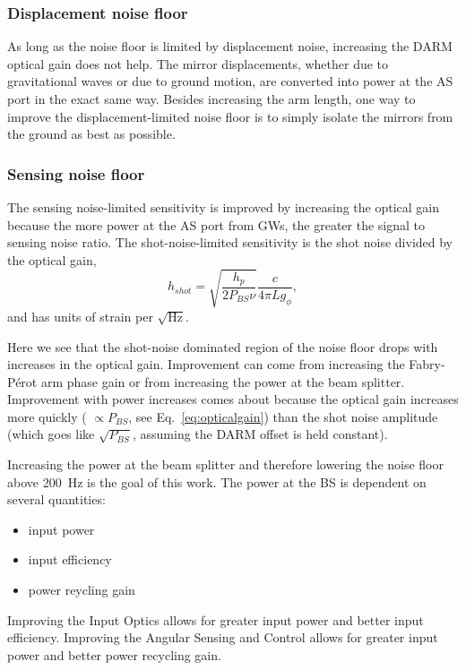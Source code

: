 \subsubsection{Displacement noise floor} 
As long as the noise floor is limited by displacement noise,
increasing the DARM optical gain does not help. The mirror
displacements, whether due to gravitational waves or due to ground
motion, are converted into power at the AS port in the exact same
way. Besides increasing the arm length, one way to improve the
displacement-limited noise floor is to simply isolate the mirrors from
the ground as best as possible.

\subsubsection{Sensing noise floor}
The sensing noise-limited sensitivity is improved by increasing the
optical gain because the more power at the AS port from GWs, the
greater the signal to sensing noise ratio. The shot-noise-limited
sensitivity is the shot noise divided by the optical gain,
\begin{equation}
h_{shot} = \sqrt{\frac{h_p}{2 P_{BS} \nu}} \frac{c}{4 \pi L g_{\phi}},
\label{eq:SNL}
\end{equation}
and has units of strain per $\sqrt{\mathrm{Hz}}$.

Here we see that the shot-noise dominated region of the noise floor
drops with increases in the optical gain. Improvement can come from
increasing the Fabry-P\'{e}rot arm phase gain or from increasing the
power at the beam splitter.  Improvement with power increases comes
about because the optical gain increases more quickly ( $\propto
P_{BS}$, see Eq.~\ref{eq:opticalgain}) than the shot noise amplitude
(which goes like $\sqrt{P_{BS}}$, assuming the DARM offset is held
constant).

Increasing the power at the beam splitter and therefore lowering the
noise floor above 200~Hz is the goal of this work. The power at the BS
is dependent on several quantities:
\begin{itemize}
\item input power \vspace{-10 pt}
\item input efficiency \vspace{-10 pt}
\item power reycling gain
\end{itemize}
Improving the Input Optics allows for greater input power and better
input efficiency. Improving the Angular Sensing and Control allows for
greater input power and better power recycling gain.



